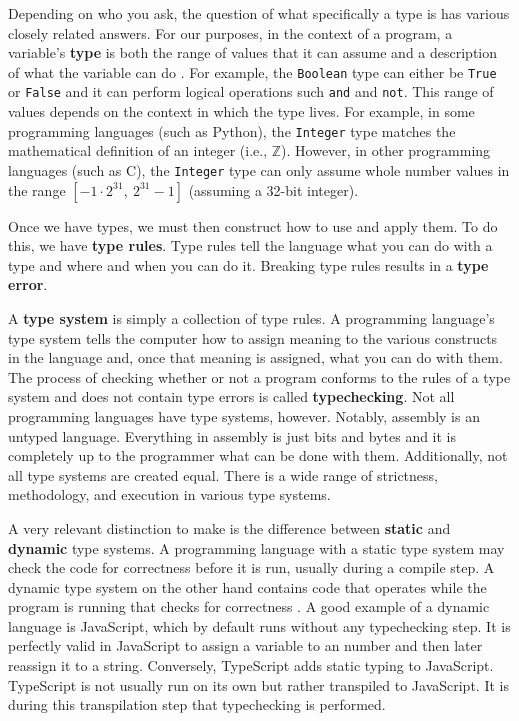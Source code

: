 \documentclass[10pt,twocolumn]{article}
\begin{document}
Depending on who you ask, the question of what specifically a type is has various closely related answers. For our purposes, in the context of a program, a variable's \textbf{type} is both the range of values that it can assume \cite{cardelli2004} and a description of what the variable can do \cite{remy2013type}. For example, the \verb|Boolean| type can either be \verb|True| or \verb|False| and it can perform logical operations such \verb|and| and \verb|not|. This range of values depends on the context in which the type lives. For example, in some programming languages (such as Python), the \verb|Integer| type matches the mathematical definition of an integer (i.e., $\mathbb{Z}$). However, in other programming languages (such as C), the \verb|Integer| type can only assume whole number values in the range $[-1 \cdot 2^{31},\  2^{31}-1]$ (assuming a 32-bit integer).

Once we have types, we must then construct how to use and apply them. To do this, we have \textbf{type rules}. Type rules tell the language what you can do with a type and where and when you can do it. Breaking type rules results in a \textbf{type error}.

A \textbf{type system} is simply a collection of type rules. A programming language's type system tells the computer how to assign meaning to the various constructs in the language and, once that meaning is assigned, what you can do with them. The process of checking whether or not a program conforms to the rules of a type system and does not contain type errors is called \textbf{typechecking}. Not all programming languages have type systems, however. Notably, assembly is an untyped language. Everything in assembly is just bits and bytes and it is completely up to the programmer what can be done with them. Additionally, not all type systems are created equal. There is a wide range of strictness, methodology, and execution in various type systems. 

A very relevant distinction to make is the difference between \textbf{static} and \textbf{dynamic} type systems. A programming language with a static type system may check the code for correctness before it is run, usually during a compile step. A dynamic type system on the other hand contains code that operates while the program is running that checks for correctness \cite{cardelli2004}. A good example of a dynamic language is JavaScript, which by default runs without any typechecking step. It is perfectly valid in JavaScript to assign a variable to an number and then later reassign it to a string. Conversely, TypeScript adds static typing to JavaScript. TypeScript is not usually run on its own but rather transpiled to JavaScript. It is during this transpilation step that typechecking is performed.
\end{document}
